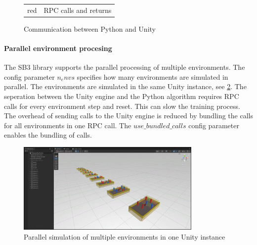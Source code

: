 \begin{figure}[h]
    \begin{tabular}{r@{: }l}
        red & RPC calls and returns \\
    \end{tabular}
    \caption{Communication between Python and Unity}
    \label{fig:communication_python_unity}
\end{figure}


\paragraph{Parallel environment procesing}

The \ac{SB3} library supports the parallel processing of multiple environments. The config parameter $n_envs$ specifies how many environments are simulated in parallel. The environments are simulated in the same Unity instance, see \ref{fig:parallel_simulation_unity_instance}. The seperation between the Unity engine and the Python algorithm requires \ac{RPC} calls for every environment step and reset. This can slow the training process. The overhead of sending calls to the Unity engine is reduced by bundling the calls for all environments in one \ac{RPC} call. The $use\_bundled\_calls$ config parameter enables the bundling of calls.

\begin{figure}
    \centering
    \includegraphics[width=0.8\textwidth]{Bilder/parallel_simulation_unity_instance.png}
    \caption{Parallel simulation of multiple environments in one Unity instance}
    \label{fig:parallel_simulation_unity_instance}
\end{figure}


